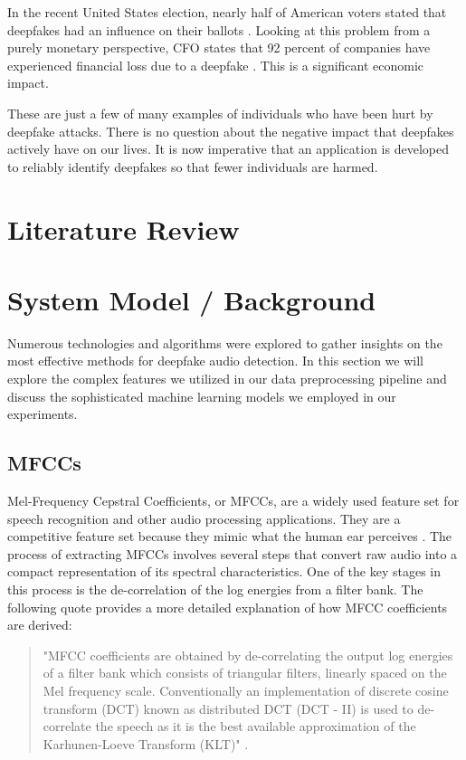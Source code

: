 \documentclass[sigconf,authordraft]{acmart}
\begin{document}
In the recent United States election, nearly half of American voters stated that deepfakes had an influence on their ballots \cite{b1}. Looking at this problem from a purely monetary perspective, CFO states that 92 percent of companies have experienced financial loss due to a deepfake \cite{b4}. This is a significant economic impact. 

These are just a few of many examples of individuals who have been hurt by deepfake attacks. There is no question about the negative impact that deepfakes actively have on our lives. It is now imperative that an application is developed to reliably identify deepfakes so that fewer individuals are harmed. 

\section{Literature Review}

\section{System Model / Background}

Numerous technologies and algorithms were explored to gather insights on the most effective methods for deepfake audio detection. In this section we will explore the complex features we utilized in our data preprocessing pipeline and discuss the sophisticated machine learning models we employed in our experiments. 

\subsection{MFCCs}

Mel-Frequency Cepstral Coefficients, or MFCCs, are a widely used feature set for speech recognition and other audio processing applications. They are a competitive feature set because they mimic what the human ear perceives \cite{9996362}. The process of extracting MFCCs involves several steps that convert raw audio into a compact representation of its spectral characteristics. One of the key stages in this process is the de-correlation of the log energies from a filter bank. The following quote provides a more detailed explanation of how MFCC coefficients are derived:

\begin{quote}
  "MFCC coefficients are obtained by de-correlating the output log
  energies of a filter bank which consists of triangular filters, linearly spaced on the Mel frequency scale.
  Conventionally an implementation of discrete cosine transform (DCT) known as distributed DCT (DCT - II) is
  used to de-correlate the speech as it is the best available approximation of the Karhunen-Loeve Transform
  (KLT)" \cite{5709752}.
\end{quote}
\end{document}
